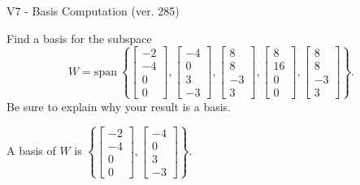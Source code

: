 \begin{exercise}
  \begin{exerciseTitle}V7 - Basis Computation (ver. 285)\end{exerciseTitle}
  \begin{exerciseStatement}
    Find a basis for the subspace 
\[W=\mathrm{span}\ \left\{\left[\begin{array}{r}
-2 \\
-4 \\
0 \\
0
\end{array}\right] , \left[\begin{array}{r}
-4 \\
0 \\
3 \\
-3
\end{array}\right] , \left[\begin{array}{r}
8 \\
8 \\
-3 \\
3
\end{array}\right] , \left[\begin{array}{r}
8 \\
16 \\
0 \\
0
\end{array}\right] , \left[\begin{array}{r}
8 \\
8 \\
-3 \\
3
\end{array}\right]\right\}.\]
 Be sure to explain why your result is a basis.


  \end{exerciseStatement}
  \begin{exerciseAnswer}
   A basis of \(W\) is  \(\left\{\left[\begin{array}{r}
-2 \\
-4 \\
0 \\
0
\end{array}\right] , \left[\begin{array}{r}
-4 \\
0 \\
3 \\
-3
\end{array}\right]\right\}\).
  


  \end{exerciseAnswer}
\end{exercise}